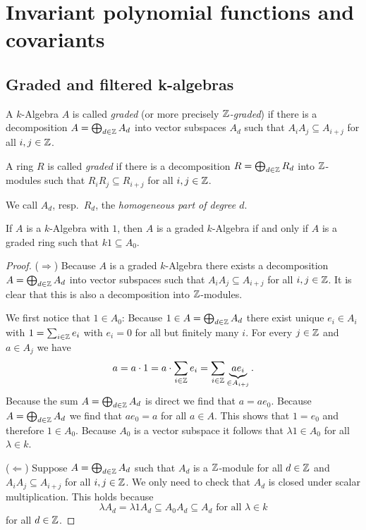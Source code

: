\chapter{Invariant polynomial functions and covariants}





\section{Graded and filtered k-algebras}


\begin{defi}
  A $k$-Algebra $A$ is called \emph{graded} (or more precisely \emph{$\mathbb{Z}$-graded}) if there is a decomposition $A = \bigoplus_{d \in \mathbb{Z}} A_d$ into vector subspaces $A_d$ such that $A_i A_j \subseteq A_{i+j}$ for all $i,j \in \mathbb{Z}$.
  
  A ring $R$ is called \emph{graded} if there is a decomposition $R = \bigoplus_{d \in \mathbb{Z}} R_d$ into $\mathbb{Z}$-modules such that $R_i R_j \subseteq R_{i+j}$ for all $i,j \in \mathbb{Z}$.
  
  We call $A_d$, resp.\ $R_d$, the \emph{homogeneous part of degree $d$}.
\end{defi}

\begin{rem}
  If $A$ is a $k$-Algebra with $1$, then $A$ is a graded $k$-Algebra if and only if $A$ is a graded ring such that $k1 \subseteq A_0$.
\end{rem}
\begin{proof}
  ($\Rightarrow$)
  Because $A$ is a graded $k$-Algebra there exists a decomposition $A = \bigoplus_{d \in \mathbb{Z}} A_d$ into vector subspaces such that $A_i A_j \subseteq A_{i+j}$ for all $i,j \in \mathbb{Z}$.
  It is clear that this is also a decomposition into $\mathbb{Z}$-modules.
  
  We first notice that $1 \in A_0$:
  Because $1 \in A = \bigoplus_{d \in \mathbb{Z}} A_d$ there exist unique $e_i \in A_i$ with $1 = \sum_{i \in \mathbb{Z}} e_i$ with $e_i = 0$ for all but finitely many $i$.
  For every $j \in \mathbb{Z}$ and $a \in A_j$ we have
  \[
      a
    = a \cdot 1
    = a \cdot \sum_{i \in \mathbb{Z}} e_i
    = \sum_{i \in \mathbb{Z}} \underbrace{a e_i}_{\in A_{i+j}}.
  \]
  Because the sum $A = \bigoplus_{d \in \mathbb{Z}} A_d$ is direct we find that $a = a e_0$.
  Because $A = \bigoplus_{d \in \mathbb{Z}} A_d$ we find that $a e_0 = a$ for all $a \in A$.
  This shows that $1 = e_0$ and therefore $1 \in A_0$.
  Because $A_0$ is a vector subspace it follows that $\lambda 1 \in A_0$ for all $\lambda \in k$.
  
  ($\Leftarrow$)
  Suppose $A = \bigoplus_{d \in \mathbb{Z}} A_d$ such that $A_d$ is a $\mathbb{Z}$-module for all $d \in \mathbb{Z}$ and $A_i A_j \subseteq A_{i+j}$ for all $i,j \in \mathbb{Z}$.
  We only need to check that $A_d$ is closed under scalar multiplication.
  This holds because
  \[
              \lambda A_d
    =         \lambda 1 A_d
    \subseteq A_0 A_d
    \subseteq A_d
    \text{ for all }
    \lambda \in k
  \]
  for all $d \in \mathbb{Z}$.
\end{proof}


